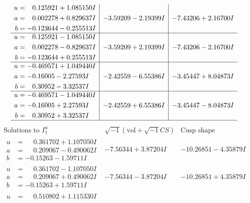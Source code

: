 \documentclass[1p]{elsarticle_modified}
\theoremstyle{definition}
\newcommand{\I}{\sqrt{-1}}
\begin{document}
$$\begin{array}{c|c|c}
\begin{aligned}
u &= \phantom{-}0.125921 + 1.085150 I \\
a &= \phantom{-}0.002278 + 0.829637 I \\
b &= -0.123644 - 0.255513 I\end{aligned}
 & -3.59209 - 2.19399 I & -7.43206 + 2.16700 I \\ \hline\begin{aligned}
u &= \phantom{-}0.125921 - 1.085150 I \\
a &= \phantom{-}0.002278 - 0.829637 I \\
b &= -0.123644 + 0.255513 I\end{aligned}
 & -3.59209 + 2.19399 I & -7.43206 - 2.16700 I \\ \hline\begin{aligned}
u &= -0.469571 + 1.049440 I \\
a &= -0.16005 - 2.27593 I \\
b &= \phantom{-}0.30952 - 3.32537 I\end{aligned}
 & -2.42559 - 6.55386 I & -3.45447 + 8.04873 I \\ \hline\begin{aligned}
u &= -0.469571 - 1.049440 I \\
a &= -0.16005 + 2.27593 I \\
b &= \phantom{-}0.30952 + 3.32537 I\end{aligned}
 & -2.42559 + 6.55386 I & -3.45447 - 8.04873 I\\
 \hline 
 \end{array}$$\newpage$$\begin{array}{c|c|c}  
\text{Solutions to }I^u_{1}& \I (\text{vol} + \sqrt{-1}CS) & \text{Cusp shape}\\
 \hline 
\begin{aligned}
u &= \phantom{-}0.361702 + 1.107050 I \\
a &= \phantom{-}0.209067 - 0.490062 I \\
b &= -0.15263 - 1.59711 I\end{aligned}
 & -7.56344 + 3.87204 I & -10.26851 - 4.35879 I \\ \hline\begin{aligned}
u &= \phantom{-}0.361702 - 1.107050 I \\
a &= \phantom{-}0.209067 + 0.490062 I \\
b &= -0.15263 + 1.59711 I\end{aligned}
 & -7.56344 - 3.87204 I & -10.26851 + 4.35879 I \\ \hline\begin{aligned}
u &= \phantom{-}0.510802 + 1.115330 I \\

\end{aligned}
\end{array}$$
\end{document}
